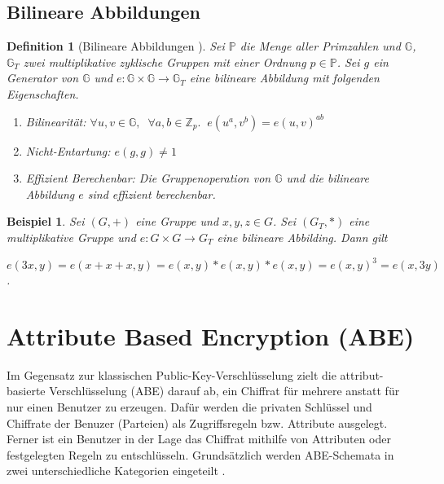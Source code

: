 \documentclass{hsflensburg}
\newtheorem{definition}{Definition}
\newtheorem*{example}{Beispiel}
\begin{document}
	\subsection{Bilineare Abbildungen}
	\begin{definition}[Bilineare Abbildungen \cite{abe}]
		Sei $\mathbb{P}$ die Menge aller Primzahlen und $\mathbb{G}$, $\mathbb{G}_T$
		zwei multiplikative zyklische Gruppen mit einer Ordnung $p \in \mathbb{P}$.
		Sei $g$ ein Generator von $\mathbb{G}$ und $e: \mathbb{G} \times \mathbb{G}
		\to \mathbb{G}_T$ eine bilineare Abbildung mit folgenden Eigenschaften.

		\begin{enumerate}
			\item Bilinearität: $\forall u, v \in \mathbb{G},\;\; \forall a, b \in
				\mathbb{Z}_p. \;\; e(u^a, v^b) = e(u, v)^{ab}$
			\item Nicht-Entartung: $e(g, g) \neq 1$
			\item Effizient Berechenbar: Die Gruppenoperation von $\mathbb{G}$ und die
				bilineare Abbildung $e$ sind effizient berechenbar.
		\end{enumerate}
	\end{definition}

	\begin{example}
		Sei $(G, +)$ eine Gruppe und $x, y, z \in G$. Sei $(G_T, *)$ eine multiplikative
		Gruppe und $e: G \times G \to G_T$ eine bilineare Abbilding. Dann gilt

		$e(3x, y) = e(x+x+x, y) = e(x, y) * e(x, y) * e(x, y) = e(x, y)^3 = e(x,
		3y)$.
	\end{example}

	\section{Attribute Based Encryption (ABE)}
	Im Gegensatz zur klassischen Public-Key-Verschlüsselung zielt die
	attribut-basierte Verschlüsselung (ABE) darauf ab, ein Chiffrat für mehrere anstatt
	für nur einen Benutzer zu erzeugen. Dafür werden die privaten Schlüssel und
	Chiffrate der Benuzer (Parteien) als Zugriffsregeln bzw. Attribute ausgelegt.
	Ferner ist ein Benutzer in der Lage das Chiffrat mithilfe von Attributen oder
	festgelegten Regeln zu entschlüsseln. Grundsätzlich werden ABE-Schemata in
	zwei unterschiedliche Kategorien eingeteilt \cite{phoabe}.
\end{document}
